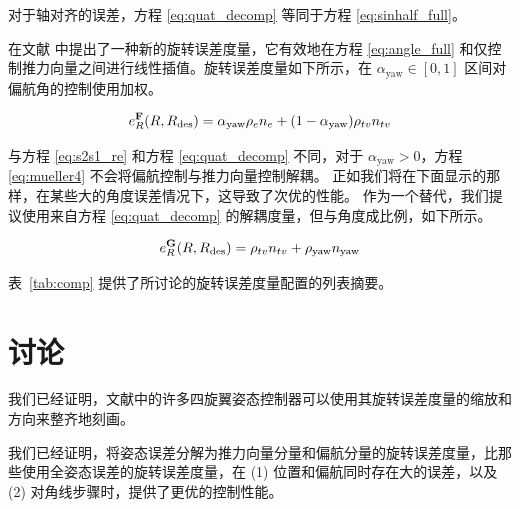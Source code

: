 \documentclass[conference]{IEEEtran}
\begin{document}
对于轴对齐的误差，方程 \eqref{eq:quat_decomp} 等同于方程 \eqref{eq:sinhalf_full}。

在文献 \citet{mueller_multicopter_2018} 中提出了一种新的旋转误差度量，它有效地在方程 \eqref{eq:angle_full} 和仅控制推力向量之间进行线性插值。旋转误差度量如下所示，在 $\alpha_{\text{yaw}} \in [0, 1]$ 区间对偏航角的控制使用加权。

\begin{align}
  \label{eq:mueller4}
  e_R^{\textbf{F}}(R, \Rdes) = \alpha_{\text{yaw}} \rho_e n_e + (1 - \alpha_{\text{yaw}}) \rho_{tv} n_{tv}
\end{align}

与方程 \eqref{eq:s2s1_re} 和方程 \eqref{eq:quat_decomp} 不同，对于 $\alpha_{\text{yaw}} > 0$，方程 \eqref{eq:mueller4} 不会将偏航控制与推力向量控制解耦。
正如我们将在下面显示的那样，在某些大的角度误差情况下，这导致了次优的性能。
作为一个替代，我们提议使用来自方程 \eqref{eq:quat_decomp} 的解耦度量，但与角度成比例，如下所示。

\begin{align}
  \label{eq:propose1}
  e_R^{\textbf{G}}(R, \Rdes) = \rho_{tv} n_{tv} + \rho_{\text{yaw}} n_{\text{yaw}}
\end{align}



表~\ref{tab:comp} 提供了所讨论的旋转误差度量配置的列表摘要。

%



\section{讨论}

我们已经证明，文献中的许多四旋翼姿态控制器可以使用其旋转误差度量的缩放和方向来整齐地刻画。

我们已经证明，将姿态误差分解为推力向量分量和偏航分量的旋转误差度量，比那些使用全姿态误差的旋转误差度量，在 (1) 位置和偏航同时存在大的误差，以及 (2) 对角线步骤时，提供了更优的控制性能。
\end{document}

